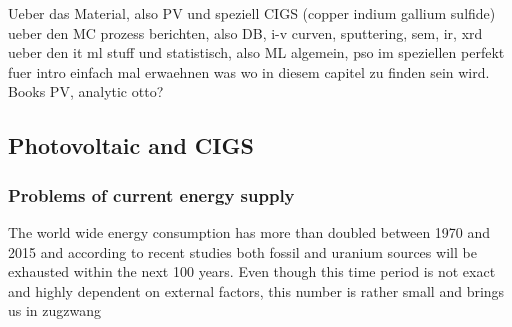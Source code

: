 Ueber das Material, also PV und speziell CIGS (copper indium gallium sulfide) 
ueber den MC prozess berichten, also DB, i-v curven, sputtering, sem, ir, xrd
ueber den it ml stuff und statistisch, also ML algemein, pso im speziellen 
perfekt fuer intro einfach mal erwaehnen was wo in diesem capitel zu finden sein wird. 
Books PV, analytic otto? 
\subsection{Photovoltaic and CIGS}
\iffalse
The grundlage for all pvs is the photovoltaik effect which was entdeckt by Albert Einstein adn for which he got the nobel price. 
The Prinziple is easy: When the energy (E = hv) of the light is \td{large,strong,big,high}er than the binding energy of an electron the electron is ejected with the remaining energy as kinetic energy 
\begin{math}
	E_{kin}=hv - Eb
\end{math}
Different Materials have different binding energies. 
Metals do have in general lower binding energies than covalent bound material and semiconductors do have even lowers E_b. Really? 
That's Silica is in a lot of PVs. 
The next generation of PVs. 
CIGS has in contrast to silicon based PV a direct band gap\td{source and what does that mean?}
duennschicht pv, haben eine effeftivitaet von 7-16\% vs 15-22\% \cite{Mertens2018}
\fi
\subsubsection{Problems of current energy supply}
The world wide energy consumption has more than doubled between 1970 and 2015\cite{BP2017} and according to recent studies both fossil\cite{BGR2017} and uranium sources\cite{Uran2006} 
will be exhausted within the next 100 years. 
Even though this time period is not exact and highly dependent on external factors, this number is rather small and brings us in zugzwang

